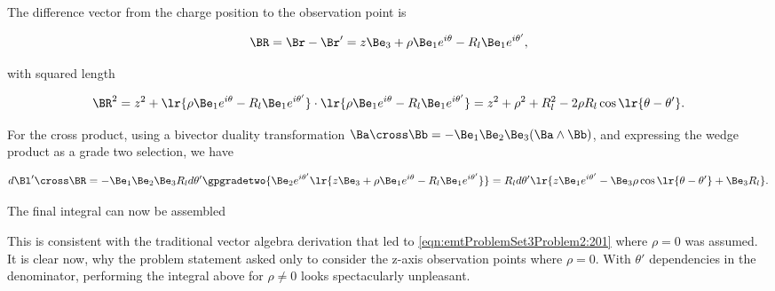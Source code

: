The difference vector from the charge position to the observation point is

\begin{dmath}\label{eqn:emtProblemSet3Problem2:120}
\BR 
= \Br - \Br'
=
z \Be_3 + \rho \Be_1 e^{i\theta}
-
R_l \Be_1 e^{i \theta'},
\end{dmath}

with squared length

\begin{dmath}\label{eqn:emtProblemSet3Problem2:140}
\BR^2 
=
z^2 + 
\lr{ \rho \Be_1 e^{i\theta}
-
R_l \Be_1 e^{i \theta'}
}
\cdot
\lr{ \rho \Be_1 e^{i\theta}
-
R_l \Be_1 e^{i \theta'}
}
=
z^2 + \rho^2 + R_l^2 - 2 \rho R_l \cos\lr{ \theta - \theta' }.
\end{dmath}

For the cross product, using a bivector duality transformation \( \Ba \cross \Bb = -\Be_1 \Be_2 \Be_3 (\Ba \wedge \Bb) \), and expressing the wedge product as a grade two selection, we have

\begin{dmath}\label{eqn:emtProblemSet3Problem2:180}
d\Bl' \cross \BR 
=
-\Be_1 \Be_2 \Be_3 R_l d\theta' \gpgradetwo{ 
\Be_2 e^{i \theta'} 
\lr{
z \Be_3 + \rho \Be_1 e^{i\theta}
-
R_l \Be_1 e^{i \theta'}
}
}
=
R_l d\theta' \lr{ 
z \Be_1 e^{i\theta'}
-
\Be_3 \rho \cos\lr{ \theta - \theta' }
+ \Be_3 R_l
}.
\end{dmath}

The final integral can now be assembled


This is consistent with the traditional vector algebra derivation that led to \cref{eqn:emtProblemSet3Problem2:201} where \( \rho = 0 \) was assumed.
It is clear now, why the problem statement asked only to consider the z-axis observation points where \( \rho = 0 \).  With \( \theta' \) dependencies in the denominator, performing the integral above for \( \rho \ne 0 \) looks spectacularly unpleasant.

